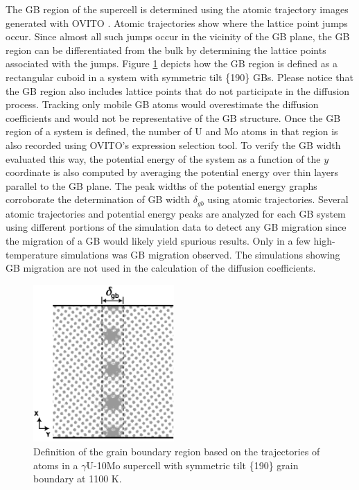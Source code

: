 \documentclass{elsarticle}
\providecommand{\DIFadd}[1]{{\protect\color{blue} \sf #1}} %
\providecommand{\DIFaddbegin}{} %
\providecommand{\DIFaddFL}[1]{\DIFadd{#1}} %
\begin{document}
\DIFaddbegin \DIFadd{The GB region of the supercell is determined using the atomic trajectory images generated with OVITO \cite{ovito}. Atomic trajectories show where the lattice point jumps occur. Since almost all such jumps occur in the vicinity of the GB plane, the GB region can be differentiated from the bulk by determining the lattice points associated with the jumps. Figure \ref{fig:def} depicts how the GB region is defined as a rectangular cuboid in a system with symmetric tilt \{190\} GBs. Please notice that the GB region also includes lattice points that do not participate in the diffusion process. Tracking only mobile GB atoms would overestimate the diffusion coefficients and would not be representative of the GB structure. Once the GB region of a system is defined, the number of U and Mo atoms in that region is also recorded using OVITO's expression selection tool. To verify the GB width evaluated this way, the potential energy of the system as a function of the $y$ coordinate is also computed by averaging the potential energy over thin layers parallel to the GB plane. The peak widths of the potential energy graphs corroborate the determination of GB width $\delta_{gb}$ using atomic trajectories. Several atomic trajectories and potential energy peaks are analyzed for each GB system using different portions of the simulation data to detect any GB migration since the migration of a GB would likely yield spurious results. Only in a few high-temperature simulations was GB migration observed. The simulations showing GB migration are not used in the calculation of the diffusion coefficients.
}

\begin{figure}[!ht]
\centering
\includegraphics[height=6cm]{gb_def.png}
\caption{\DIFaddFL{Definition of the grain boundary region based on the trajectories of atoms in a $\gamma$U-10Mo supercell with symmetric tilt \{190\} grain boundary at 1100 K.}}
\label{fig:def}
\end{figure}
\end{document}
